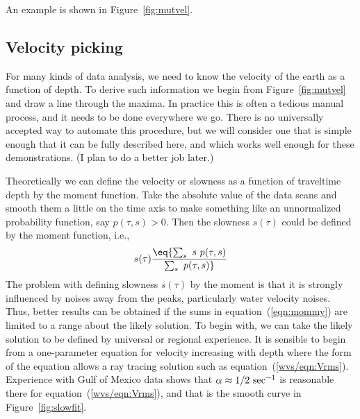 
\par
An example %
is shown in Figure~\ref{fig:mutvel}.


\subsection{Velocity picking}
For many kinds of data analysis,
we need to know the velocity of the earth as a function of depth.
To derive such information
we begin from Figure~\ref{fig:mutvel}
and draw a line through the maxima.
In practice this is often a tedious manual process,
and it needs to be done everywhere we go.
There is no universally accepted way to automate
this procedure, but we will consider one
that is simple enough that it can be fully described here,
and which works well enough for these demonstrations.
(I plan to do a better job later.)

\par
Theoretically we can define the velocity or slowness
as a function of traveltime depth by the moment function.
Take the absolute value of the data scans and smooth
them a little on the time axis to make something like an unnormalized
probability function, say $p(\tau ,s)>0$.
Then the slowness $s(\tau )$ could be defined by the moment function, i.e.,
\begin{equation}
s(\tau ) \eq { \sum_s \ s\  p(\tau ,s) \over \sum_s \ p(\tau ,s) }
\label{eqn:mommy}
\end{equation}
The problem with defining slowness $s(\tau )$ by the moment is that it is 
strongly influenced by noises away from the peaks,
particularly water velocity noises.
Thus, better results can be obtained if the sums in equation~(\ref{eqn:mommy})
are limited to a range about the likely solution.
To begin with, we can take the likely solution to be defined
by universal or regional experience.
It is sensible to begin from a one-parameter equation
for velocity increasing with depth where the form of the equation
allows a ray tracing solution
such as equation~(\ref{wvs/eqn:Vrms}).
Experience with Gulf of Mexico data shows that
$\alpha\approx 1/2\  {\rm sec}^{-1}$ is reasonable there
for equation~(\ref{wvs/eqn:Vrms}),
and that is the smooth curve
in Figure~\ref{fig:slowfit}.

